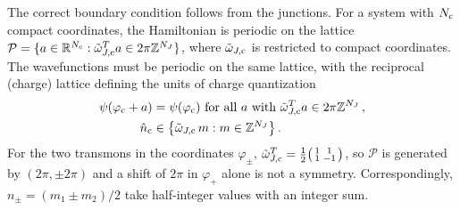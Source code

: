 The correct boundary condition follows from the junctions.
For a system with $N_{\rm c}$ compact coordinates, the Hamiltonian is periodic on the lattice $\mathcal P=\{a\in\mathbb R^{N_{\rm c}}:\tilde\omega_{J,\rm c}^Ta\in2\pi\mathbb Z^{N_J}\}$, where $\tilde \omega_{J, \rm c}$ is restricted to compact coordinates. The wavefunctions must be periodic on the same lattice, with the reciprocal (charge) lattice defining the units of charge quantization
\begin{equation}
\begin{aligned}
    \psi(\varphi_{\rm c}+a)&=\psi(\varphi_{\rm c})  \text{ for all } a \text{ with } \tilde\omega_{J,\rm c}^Ta\in2\pi\mathbb Z^{N_J} \, , \\
    \hat n_{\rm c}&\in\bigl\{\tilde\omega_{J,\rm c}\,m : m\in\mathbb Z^{N_J}\bigr\} \, .
\end{aligned}
\label{eq:compact_bc_general}
\end{equation}
For the two transmons in the coordinates $\varphi_\pm$, $\tilde\omega_{J,\rm c}^T=\tfrac12\bigl(\begin{smallmatrix}1&1\\1&-1\end{smallmatrix}\bigr)$, so $\mathcal P$ is generated by $(2\pi,\pm2\pi)$ and a shift of $2\pi$ in $\varphi_+$ alone is not a symmetry.
Correspondingly, $n_\pm=(m_1\pm m_2)/2$ take half-integer values with an integer sum.

